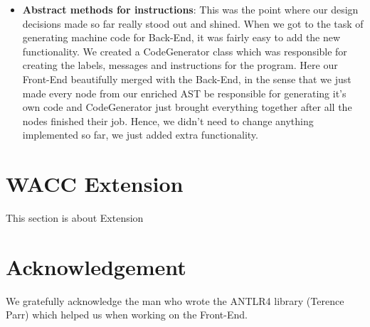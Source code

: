 \documentclass[11pt]{article}
\begin{document}
\begin{itemize}[noitemsep,topsep=0pt]
  \item \textbf{Abstract methods for instructions}:
    This was the point where our design decisions made so far really stood out and shined. When we got to the task of generating machine code for Back-End, it was fairly easy to add the new functionality. We created a CodeGenerator class which was responsible for creating the labels, messages and instructions for the program. Here our Front-End beautifully merged with the Back-End, in the sense that we just made every node from our enriched AST be responsible for generating it's own code and CodeGenerator just brought everything together after all the nodes finished their job. Hence, we didn't need to change anything implemented so far, we just added extra functionality.
\end{itemize}


\section{WACC Extension}
\iffalse
BEYOND THE SPECIFICATION(4/4)
1. An evaluation of your extensions to your WACC compiler
2. Describe all of the language extensions, optimisations or other aspects that you have added to your compiler, including how these features can be accessed or viewed
3. BRIEFLY discuss what future extensions you would like to add to your WACC compiler if you had more time
\fi
This section is about Extension


\section{Acknowledgement}
We gratefully acknowledge the man who wrote the ANTLR4 library (Terence Parr) which helped us when working on the Front-End.
\end{document}
